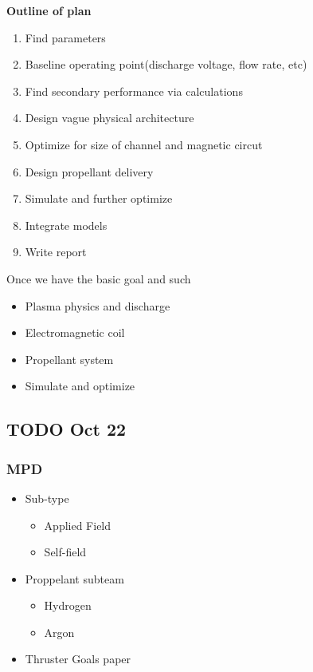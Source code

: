 \textbf{Outline of plan}
\begin{enumerate}
	\item Find parameters
	\item Baseline operating point(discharge voltage, flow rate, etc)
	\item Find secondary performance via calculations
	\item Design vague physical architecture
	\item Optimize for size of channel and magnetic circut
	\item Design propellant delivery
	\item Simulate and further optimize
	\item Integrate models
	\item Write report
\end{enumerate}

Once we have the basic goal and such
\begin{itemize}
  \item Plasma physics and discharge
  \item Electromagnetic coil
  \item Propellant system
  \item Simulate and optimize
\end{itemize}

\subsection{TODO Oct 22}

\subsubsection{MPD}
\begin{itemize}
  \item Sub-type
  \begin{itemize}
    \item Applied Field
    \item Self-field
  \end{itemize}
  \item Proppelant subteam
  \begin{itemize}
    \item Hydrogen
    \item Argon
  \end{itemize}
  \item Thruster Goals paper
\end{itemize}

